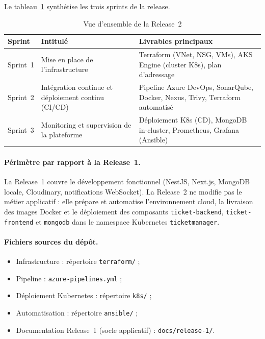 Le tableau~\ref{tab:r2-overview} synthétise les trois sprints de la release.

\begin{table}[H]
\centering
\caption{Vue d'ensemble de la Release~2}
\label{tab:r2-overview}
\footnotesize
\renewcommand{\arraystretch}{1.15}
\setlength{\tabcolsep}{6pt}
\begin{tabular}{|p{1.2cm}|p{4.2cm}|p{7.8cm}|}
\hline
\textbf{Sprint} & \textbf{Intitulé} & \textbf{Livrables principaux} \\
\hline
Sprint~1 & Mise en place de l'infrastructure &
  Terraform (VNet, NSG, VMs), AKS Engine (cluster K8s), plan d'adressage \\
\hline
Sprint~2 & Intégration continue et déploiement continu (CI/CD) &
  Pipeline Azure DevOps, SonarQube, Docker, Nexus, Trivy, Terraform automatisé \\
\hline
Sprint~3 & Monitoring et supervision de la plateforme &
  Déploiement K8s (CD), MongoDB in-cluster, Prometheus, Grafana (Ansible) \\
\hline
\end{tabular}
\end{table}

\paragraph{Périmètre par rapport à la Release~1.}
La Release~1 couvre le développement fonctionnel (NestJS, Next.js, MongoDB locale,
Cloudinary, notifications WebSocket). La Release~2 ne modifie pas le métier applicatif :
elle prépare et automatise l'environnement cloud, la livraison des images Docker et le
déploiement des composants \texttt{ticket-backend}, \texttt{ticket-frontend} et
\texttt{mongodb} dans le namespace Kubernetes \texttt{ticketmanager}.

\paragraph{Fichiers sources du dépôt.}
\begin{itemize}
  \item Infrastructure : répertoire \texttt{terraform/} ;
  \item Pipeline : \texttt{azure-pipelines.yml} ;
  \item Déploiement Kubernetes : répertoire \texttt{k8s/} ;
  \item Automatisation : répertoire \texttt{ansible/} ;
  \item Documentation Release~1 (socle applicatif) : \texttt{docs/release-1/}.
\end{itemize}

